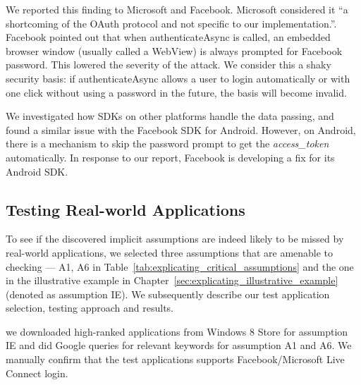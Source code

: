We reported this finding to Microsoft and Facebook.  Microsoft considered it ``a shortcoming of the OAuth protocol and not specific to our implementation.''.  Facebook pointed out that when authenticateAsync is called, an embedded browser window (usually called a WebView) is always prompted for Facebook password.  This lowered the severity of the attack.  We consider this a shaky security basis: if authenticateAsync allows a user to login automatically or with one click without using a password in the future, the basis will become invalid. 

We investigated how SDKs on other platforms handle the data passing, and found a similar issue with the Facebook SDK for Android.  However, on Android, there is a mechanism to skip the password prompt to get the \emph{access\_token} automatically. In response to our report, Facebook is developing a fix for its Android SDK.

\subsection{Testing Real-world Applications}
\label{sec:explicating_test}

To see if the discovered implicit assumptions are indeed likely to be missed by real-world applications, we selected three assumptions that are amenable to checking --- A1, A6 in Table~\ref{tab:explicating_critical_assumptions} and the one in the illustrative example in Chapter~\ref{sec:explicating_illustrative_example} (denoted as assumption IE).  We subsequently describe our test application selection, testing approach and results.

 we downloaded high-ranked applications from Windows 8 Store for assumption IE and did Google queries for relevant keywords for assumption A1 and A6.  We manually confirm that the test applications supports Facebook/Microsoft Live Connect login.

